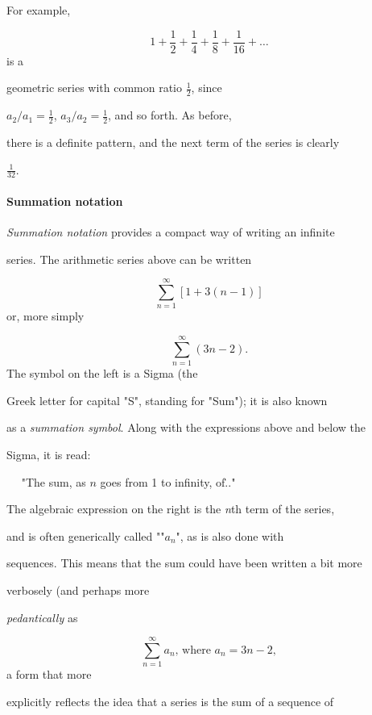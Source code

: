 For example,



$$1+\frac{1}{2}+\frac{1}{4}+\frac{1}{8}+\frac{1}{16}+\ldots$$ is a

geometric series with common ratio $\tfrac{1}{2}$, since

$a _2/a _1=\tfrac{1}{2}$, $a _3/a _2=\tfrac{1}{2}$, and so forth. As before,

there is a definite pattern, and the next term of the series is clearly

$\tfrac{1}{32}$.



\paragraph{Summation notation}



\textit{Summation notation} provides a compact way of writing an infinite

series. The arithmetic series above can be written



$$\sum _{n=1}^{\infty} [1+3(n-1)]$$ or, more simply



$$\sum _{n=1}^{\infty} (3n-2).$$ The symbol on the left is a Sigma (the

Greek letter for capital "S", standing for "Sum"); it is also known

as a \textit{summation symbol}. Along with the expressions above and below the

Sigma, it is read:



$\quad$ "The sum, as $n$ goes from 1 to infinity, of\..."



The algebraic expression on the right is the \textit{n}th term of the series,

and is often generically called ""$a _n$", as is also done with

sequences. This means that the sum could have been written a bit more

verbosely (and perhaps more

\textit{pedantically} as



$$\sum _{n=1}^{\infty} a _n \text{, where } a _n=3n-2,$$ a form that more

explicitly reflects the idea that a series is the sum of a sequence of

